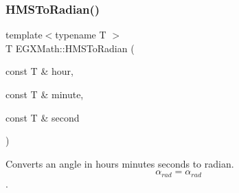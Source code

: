 \mbox{\label{group___e_g_x_math-_angle_conversions-_h_m_s_ga5f0873c7c013ba2c5784de3725f2c042}} 
\subsubsection{\texorpdfstring{H\+M\+S\+To\+Radian()}{HMSToRadian()}}
{\footnotesize\ttfamily template$<$typename T $>$ \\
T E\+G\+X\+Math\+::\+H\+M\+S\+To\+Radian (\begin{DoxyParamCaption}\item[{const T \&}]{hour,  }\item[{const T \&}]{minute,  }\item[{const T \&}]{second }\end{DoxyParamCaption})}



Converts an angle in hours minutes seconds to radian. \[\alpha_{rad}=\alpha_{rad}\]. 

